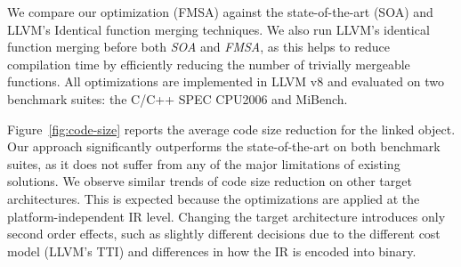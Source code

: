 \documentclass[10pt,twocolumn,nocopyrightspace]{sigplanconf}
\begin{document}
We compare our optimization (FMSA) against the state-of-the-art (SOA) and LLVM's Identical function merging techniques.
We also run LLVM's identical function merging before both \textit{SOA} and \textit{FMSA}, as this helps to reduce
compilation time by efficiently reducing the number of trivially mergeable functions.
All optimizations are implemented in LLVM v8 and evaluated on two benchmark suites: the C/C++ SPEC CPU2006 and MiBench.

Figure~\ref{fig:code-size} reports the average code size reduction for the linked object.
Our approach significantly outperforms the state-of-the-art on both benchmark suites, as it does not suffer from any of the major limitations of existing solutions.
We observe similar trends of code size reduction on other target architectures. This is expected because the
optimizations are applied at the platform-independent IR level. Changing the target architecture introduces only second order effects,
such as slightly different decisions due to the different cost model (LLVM's TTI) and differences in how the IR is encoded into binary.




\end{document}
